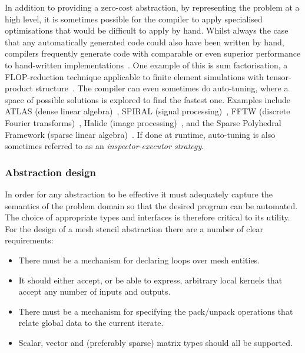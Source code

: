 \documentclass[thesis]{subfiles}
\begin{document}
In addition to providing a zero-cost abstraction, by representing the problem at a high level, it is sometimes possible for the compiler to apply specialised optimisations that would be difficult to apply by hand.
Whilst always the case that any automatically generated code could also have been written by hand, compilers frequently generate code with comparable or even superior performance to hand-written implementations~\cite{ragan-kelleyHalideLanguageCompiler}.
One example of this is sum factorisation, a FLOP-reduction technique applicable to finite element simulations with tensor-product structure~\cite{homolyaExposingExploitingStructure2017}.
The compiler can even sometimes do auto-tuning, where a space of possible solutions is explored to find the fastest one.
Examples include ATLAS (dense linear algebra)~\cite{whaleyAutomatedEmpiricalOptimizations2001}, SPIRAL (signal processing)~\cite{puschelSPIRALCodeGeneration2005}, FFTW (discrete Fourier transforms)~\cite{frigoDesignImplementationFFTW32005}, Halide (image processing)~\cite{ragan-kelleyHalideLanguageCompiler}, and the Sparse Polyhedral Framework (sparse linear algebra)~\cite{stroutSparsePolyhedralFramework2018}.
If done at runtime, auto-tuning is also sometimes referred to as an \emph{inspector-executor strategy}.

\subsubsection{Abstraction design}

In order for any abstraction to be effective it must adequately capture the semantics of the problem domain so that the desired program can be automated.
The choice of appropriate types and interfaces is therefore critical to its utility.
For the design of a mesh stencil abstraction there are a number of clear requirements:
\begin{itemize}
  \item There must be a mechanism for declaring loops over mesh entities.
  \item It should either accept, or be able to express, arbitrary local kernels that accept any number of inputs and outputs.
  \item There must be a mechanism for specifying the pack/unpack operations that relate global data to the current iterate.
  \item Scalar, vector and (preferably sparse) matrix types should all be supported.
\end{itemize}
\end{document}
